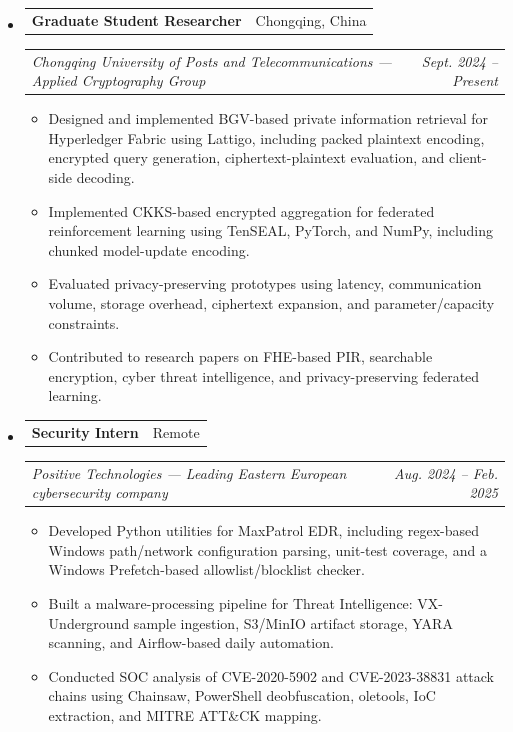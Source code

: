 \documentclass[10.5pt,letterpaper]{article}
\makeatletter
\newcommand{\headerrow}[2]
{\begin{tabular*}{\linewidth}{l@{\extracolsep{\fill}}r}
#1 & #2 \\
\end{tabular*}}
\makeatother
\begin{document}
\begin{itemize}[leftmargin=0em, itemsep=0.45em]
    \renewcommand\labelitemi{}

    \item
    \headerrow
        {\textbf{Graduate Student Researcher}}
        {Chongqing, China}
    \headerrow
        {\emph{Chongqing University of Posts and Telecommunications --- Applied Cryptography Group}}
        {\emph{Sept. 2024 -- Present}}
    \begin{itemize}[leftmargin=1.2em, itemsep=0.05em]
        \renewcommand\labelitemi{$\bullet$}
        \item Designed and implemented BGV-based private information retrieval for Hyperledger Fabric using Lattigo, including packed plaintext encoding, encrypted query generation, ciphertext-plaintext evaluation, and client-side decoding.
        \item Implemented CKKS-based encrypted aggregation for federated reinforcement learning using TenSEAL, PyTorch, and NumPy, including chunked model-update encoding.
        \item Evaluated privacy-preserving prototypes using latency, communication volume, storage overhead, ciphertext expansion, and parameter/capacity constraints.
        \item Contributed to research papers on FHE-based PIR, searchable encryption, cyber threat intelligence, and privacy-preserving federated learning.
    \end{itemize}

    \item
    \headerrow
        {\textbf{Security Intern}}
        {Remote}
    \headerrow
        {\emph{Positive Technologies --- Leading Eastern European cybersecurity company}}
        {\emph{Aug. 2024 -- Feb. 2025}}
    \begin{itemize}[leftmargin=1.2em, itemsep=0.05em]
        \renewcommand\labelitemi{$\bullet$}
        \item Developed Python utilities for MaxPatrol EDR, including regex-based Windows path/network configuration parsing, unit-test coverage, and a Windows Prefetch-based allowlist/blocklist checker.
        \item Built a malware-processing pipeline for Threat Intelligence: VX-Underground sample ingestion, S3/MinIO artifact storage, YARA scanning, and Airflow-based daily automation.
        \item Conducted SOC analysis of CVE-2020-5902 and CVE-2023-38831 attack chains using Chainsaw, PowerShell deobfuscation, oletools, IoC extraction, and MITRE ATT\&CK mapping.
    \end{itemize}


\end{itemize}
\end{document}
